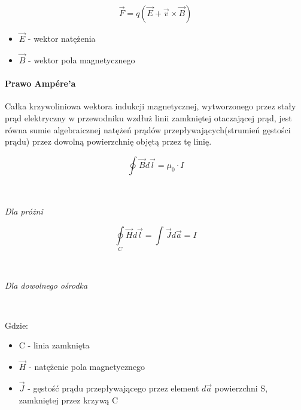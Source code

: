 \documentclass{article}
\begin{document}
            \begin{equation}
                \vec{F} = q(\vec{E} + \vec{v} \times \vec{B})     
            \end{equation}

            \begin{itemize}
                \item $\vec{E}$ - wektor natężenia
                \item $\vec{B}$ - wektor pola magnetycznego
            \end{itemize}

            \paragraph{Prawo Amp\'ere'a}
            Całka krzywoliniowa wektora indukcji magnetycznej, wytworzonego przez stały
            prąd elektryczny w przewodniku wzdłuż linii zamkniętej otaczającej prąd, jest 
            równa sumie algebraicznej natężeń prądów przepływających(strumień gęstości
            prądu) przez dowolną powierzchnię objętą przez tę linię.

            \begin{equation}
                \oint\nolimits_{} \vec{B} d\vec{l} = \mu_0\cdotp I
            \end{equation}
            
            \
            
            \textit{Dla próżni}

            \begin{equation}
                \oint\limits_{C} \vec{H} d\vec{l} = \int\nolimits_{} \vec{J}d\vec{a} = I
            \end{equation}
                        
            \
            
            \textit{Dla dowolnego ośrodka}

            \
            
            Gdzie:
            \begin{itemize}
                \item C - linia zamknięta
                \item $\vec{H}$ - natężenie pola magnetycznego
                \item $\vec{J}$ - gęstość prądu przepływającego przez element
                $d\vec{a}$ powierzchni S, zamkniętej przez krzywą C
            \end{itemize}
\end{document}
